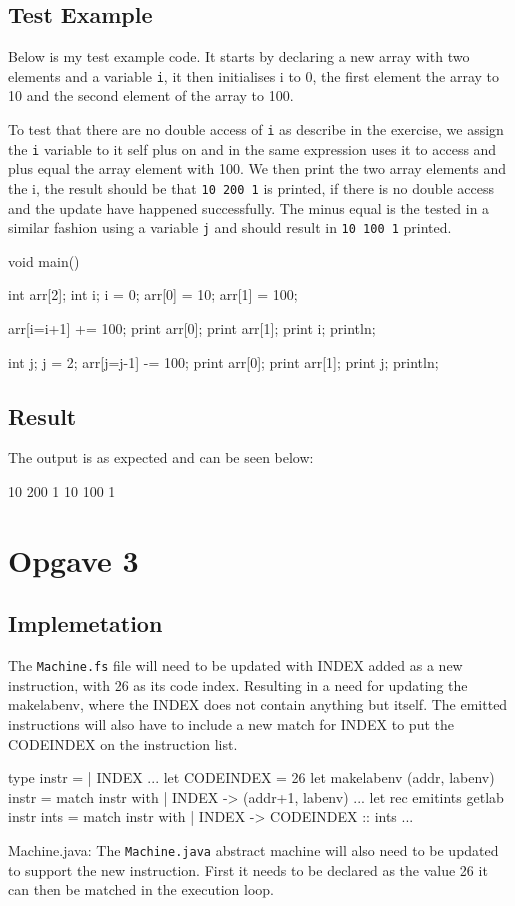 \subsection{Test Example}
Below is my test example code. It starts by declaring a new array with two
elements and a variable \texttt{i}, it then initialises i to 0, the first element the
array to 10 and the second element of the array to 100.

To test that there are no double access of \texttt{i} as describe in the
exercise, we assign the \texttt{i} variable to it self plus on and in the same
expression uses it to access and plus equal the array element with 100. We then
print the two array elements and the i, the result should be that \texttt{10 200
1} is printed, if there is no double access and the update have happened
successfully. The minus equal is the tested in a similar fashion using a
variable \texttt{j} and should result in \texttt{10 100 1} printed.
\begin{ccode}
void main() {
    int arr[2];
    int i;
    i = 0;
    arr[0] = 10;
    arr[1] = 100;
    
    arr[i=i+1] += 100;
    print arr[0];
    print arr[1];
    print i;
    println;

    int j;
    j = 2;
    arr[j=j-1] -= 100;
    print arr[0];
    print arr[1];
    print j;
    println;
}
\end{ccode}
\subsection{Result}
The output is as expected and can be seen below:
\begin{bashcode}
10 200 1 
10 100 1
\end{bashcode}

\section{Opgave 3}
\subsection{Implemetation}
The \texttt{Machine.fs} file will need to be updated with INDEX added as a new
instruction, with 26 as its code index. Resulting in a need for updating the
makelabenv, where the INDEX does not contain anything but itself. The emitted
instructions will also have to include a new match for INDEX to put the
CODEINDEX on the instruction list.
\begin{fs}
type instr =
    | INDEX 
...
let CODEINDEX  = 26
let makelabenv (addr, labenv) instr = 
    match instr with
    | INDEX          -> (addr+1, labenv)
...
let rec emitints getlab instr ints = 
    match instr with
    | INDEX          -> CODEINDEX  :: ints
...
\end{fs}
Machine.java:
The \texttt{Machine.java} abstract machine will also need to be updated to
support the new instruction. First it needs to be declared as the value 26 it
can then be matched in the execution loop.

